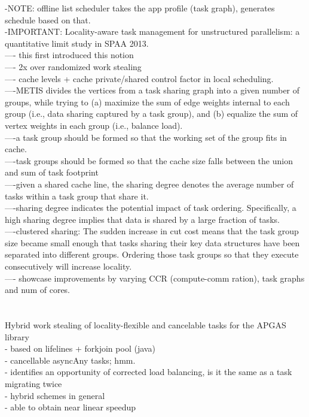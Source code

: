 \documentclass{article}
\begin{document}
-NOTE: offline list scheduler takes the app profile (task graph), generates
schedule based on that.\\ 
-IMPORTANT: Locality-aware task management for unstructured parallelism: a quantitative limit study
in SPAA 2013.\\
   ---- this first introduced this notion\\
   ---- 2x over randomized work stealing\\
	---- cache levels + cache private/shared control factor in local
scheduling.\\
	----METIS divides the vertices from a task sharing graph into a given number
of groups, while trying to (a) maximize the sum of edge weights internal to each
group (i.e., data sharing captured by a task group), and (b) equalize the sum of
vertex weights in each group (i.e., balance load).\\
  ----a task group should be formed so that the working set of the group fits in cache.\\
  ----task groups should be formed so that the cache size falls between the
union and sum of task footprint\\
  ----given a shared cache line, the sharing degree denotes the average number
of tasks within a task group that share it.\\
  ----sharing degree indicates the potential impact of task ordering.
Specifically, a high sharing degree implies that data is shared by a large
fraction of tasks.\\
  ----clustered sharing: The sudden increase in cut cost means that the task
group size became small enough that tasks sharing their key data structures have
been separated into different groups. Ordering those task groups so that they
execute consecutively will increase locality.\\
  ----
showcase improvements by varying CCR (compute-comm ration), task graphs and
num
of cores.\\
\cite{5599103}\\

\cite{Posner2018}\\
Hybrid work stealing of locality-flexible and cancelable tasks for the APGAS library\\
- based on lifelines + forkjoin pool (java)\\
- cancellable asyncAny tasks; hmm. \\
- identifies an opportunity of corrected load balancing, is it the same as a task migrating twice\\
- hybrid schemes in general\\
- able to obtain near linear speedup\\
\end{document}
